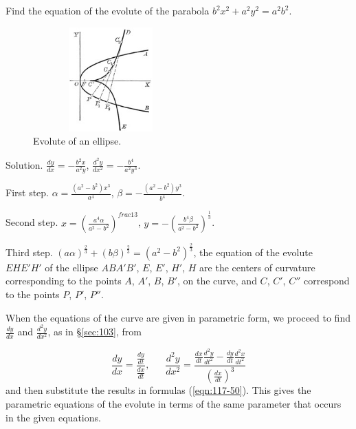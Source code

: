\begin{example}
{\rm
Find the equation of the evolute of the parabola $b^2x^2+a^2y^2 = a^2b^2$.

\begin{figure}[h!]
\begin{minipage}{\textwidth}
\begin{center}
\includegraphics[height=4cm,width=6cm]{evolute-of-ellipse.eps}
\end{center}
\end{minipage}
\caption{Evolute of an ellipse.}
\label{fig:evolute-of-an-ellipse}
\end{figure}

Solution. 	
$\frac{dy}{dx} 	= -\frac{b^2 x}{a^2 y}$, 
$\frac{d^2 y}{dx^2} = -\frac{b^4}{a^2 y^3}$.

First step. $\alpha = \frac{(a^2 - b^2)x^3}{a^4}$,
$\beta 	= -\frac{(a^2 - b^2)y^3}{b^4}$.

Second step. 	
$x 	= \left( \frac{a^4 \alpha}{a^2 - b^2} \right)^{frac{1}{3}}$,
$y 	= -\left( \frac{b^4 \beta}{a^2 - b^2} \right)^{\frac{1}{3}}$.

Third step. $(a\alpha)^{\frac{2}{3}} + (b\beta)^{\frac{2}{3}} 
= (a^2 - b^2)^{\frac{2}{3}}$, the equation of the evolute 
$EHE'H'$ of the ellipse $ABA'B'$, $E$, $E'$, $H'$, $H$ are the 
centers of curvature corresponding to the points $A$, $A'$, $B$, $B'$, 
on the curve, and $C$, $C'$, $C''$ correspond to the points 
$P$, $P'$, $P''$.
}
\end{example}

When the equations of the curve are given in parametric form, 
we proceed to find $\frac{dy}{dx}$ and $\frac{d^2 y}{dx^2}$, 
as in \S \ref{sec:103}, from %

\begin{equation}
\label{eqn:119A}
\frac{dy}{dx} 
= \frac{ \frac{dy}{dt} }{ \frac{dx}{dt} }, 
\ \ \ \ \ \ \ 
\frac{d^2 y}{dx^2} 
= \frac{ \frac{dx}{dt} \frac{d^2 y}{dt^2} 
- \frac{dy}{dt} \frac{d^2 x}{dt^2} }{ \left( \frac{dx}{dt} \right)^3 }
\end{equation}
and then substitute the results in 
formulas (\ref{eqn:117-50}). %
This gives the parametric equations of the evolute in terms 
of the same parameter that occurs in the given equations.


